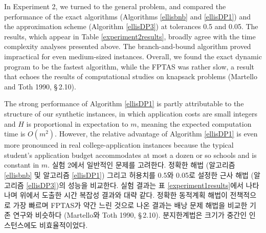 \documentclass[11pt]{article} %
\newif\ifen
\theoremstyle{definition}
\theoremstyle{definition}
\begin{document}

\ifen
In Experiment 2, we turned to the general problem, and compared the performance of the exact algorithms (Algorithms \ref{ellisbnb} and \ref{ellisDP1}) and the approximation scheme (Algorithm \ref{ellisDP3}) at tolerances 0.5 and 0.05.  The results, which appear in Table \ref{experiment2results}, broadly agree with the time complexity analyses presented above. The branch-and-bound algorithm proved impractical for even medium-sized instances. Overall, we found the exact dynamic program to be the fastest algorithm, while the FPTAS was rather slow, a result that echoes the results of computational studies on knapsack problems (Martello and Toth 1990, \S\,2.10).

The strong performance of Algorithm \ref{ellisDP1} is partly attributable to the structure of our synthetic instances, in which application costs are small integers and $H$ is proportional in expectation to $m$, meaning the expected computation time is $O(m^2)$. However, the relative advantage of Algorithm \ref{ellisDP1} is even more pronounced in real college-application instances because the typical student's application budget accommodates at most a dozen or so schools and is constant in $m$. 
\else
실험 2에서 일반적인 문제를 고려한다. 정확한 해법 (알고리즘 \ref{ellisbnb} 및 알고리즘 \ref{ellisDP1}) 그리고 허용치를 0.5와 0.05로 설정한 근사 해법 (알고리즘 \ref{ellisDP3})의 성능을 비교한다. 실험 결과는 표 \ref{experiment1results}에서 나타나며 위에서 도출한 시간 복잡성 결과와 대략 같다. 정확한 동적계획 해법이 전책적으로 가장 빠르며 FPTAS가 약간 느린 것으로 나온 결과는 배낭 문제 해법을 비교한 기존 연구와 비슷하다 (Martello와 Toth 1990, \S\,2.10). 분지한계법은 크기가 중간인 인스턴스에도 비효율적이었다. 
\end{document}
